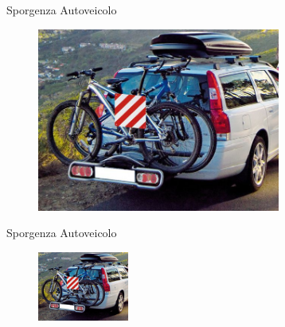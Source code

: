 \begin{frame}{Sporgenza Autoveicolo}
	\begin{figure}[ht!]
    		\centering
         		\includegraphics[width = 8cm]{images/esempio_sporgenza.jpg}
    	\end{figure}
\end{frame} 

    
    
    
    
\begin{frame}{Sporgenza Autoveicolo}
	\begin{figure}[ht!]
    		\centering
         		\includegraphics[width = 3cm]{images/esempio_sporgenza.jpg}
    	\end{figure}
    	\begin{description}
    	\item<1->[ - anteriore: ] 
    	\item<3->[- posteriore: ] 
    	\item<5->[- laterale: ] 
    	\item<7->[- altezza: ] 
    	\end{description}
\end{frame} 
    

